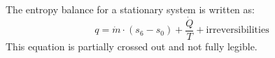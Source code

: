 The entropy balance for a stationary system is written as:  
\[
q = \dot{m} \cdot (s_6 - s_0) + \frac{\dot{Q}}{T} + \text{irreversibilities}
\]  
This equation is partially crossed out and not fully legible.